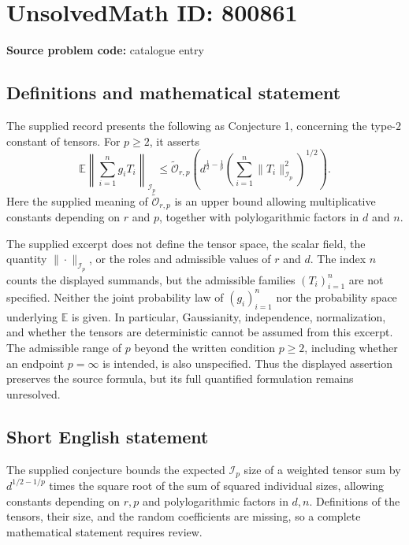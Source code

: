 \documentclass[11pt]{article}
\begin{document}
\section*{UnsolvedMath ID: 800861}
\textbf{Source problem code:} catalogue entry
\subsection{Definitions and mathematical statement}
The supplied record presents the following as Conjecture 1, concerning the type-$2$ constant of tensors. For $p\geq 2$, it asserts
\[
\mathbb{E}\left\|\sum_{i=1}^{n}g_iT_i\right\|_{\mathcal{I}_p}
\leq
\widetilde{\mathcal{O}}_{r,p}\left(
 d^{\frac12-\frac1p}
 \left(\sum_{i=1}^{n}\|T_i\|_{\mathcal{I}_p}^{2}\right)^{1/2}
\right).
\]
Here the supplied meaning of $\widetilde{\mathcal{O}}_{r,p}$ is an upper bound allowing multiplicative constants depending on $r$ and $p$, together with polylogarithmic factors in $d$ and $n$.

The supplied excerpt does not define the tensor space, the scalar field, the quantity $\|\cdot\|_{\mathcal{I}_p}$, or the roles and admissible values of $r$ and $d$. The index $n$ counts the displayed summands, but the admissible families $(T_i)_{i=1}^{n}$ are not specified. Neither the joint probability law of $(g_i)_{i=1}^{n}$ nor the probability space underlying $\mathbb{E}$ is given. In particular, Gaussianity, independence, normalization, and whether the tensors are deterministic cannot be assumed from this excerpt. The admissible range of $p$ beyond the written condition $p\geq 2$, including whether an endpoint $p=\infty$ is intended, is also unspecified. Thus the displayed assertion preserves the source formula, but its full quantified formulation remains unresolved.
\subsection{Short English statement}
The supplied conjecture bounds the expected $\mathcal{I}_p$ size of a weighted tensor sum by $d^{1/2-1/p}$ times the square root of the sum of squared individual sizes, allowing constants depending on $r,p$ and polylogarithmic factors in $d,n$. Definitions of the tensors, their size, and the random coefficients are missing, so a complete mathematical statement requires review.
\end{document}
